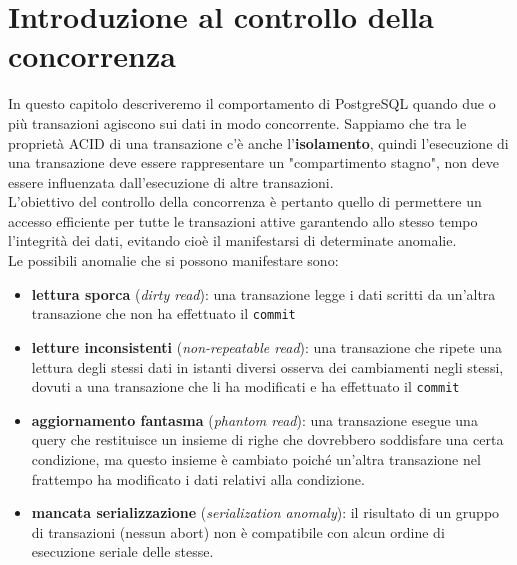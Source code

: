 \documentclass[12pt,a4paper]{book}
\begin{document}
	\chapter{Introduzione al controllo della concorrenza}
	In questo capitolo descriveremo il comportamento di PostgreSQL quando due o più transazioni agiscono sui dati in modo concorrente. Sappiamo che tra le proprietà ACID di una transazione c'è anche l'\textbf{isolamento}, quindi l'esecuzione di una transazione deve essere rappresentare un "compartimento stagno", non deve essere influenzata dall'esecuzione di altre transazioni. \\L'obiettivo del controllo della concorrenza è pertanto quello di permettere un accesso efficiente per tutte le transazioni attive garantendo allo stesso tempo l'integrità dei dati, evitando cioè il manifestarsi di determinate anomalie.\\Le possibili anomalie che si possono manifestare sono:
	\begin{itemize}
		\item \textbf{lettura sporca} (\textit{dirty read}): una transazione legge i dati scritti da un'altra transazione che non ha effettuato il \texttt{commit}
		\item \textbf{letture inconsistenti} (\textit{non-repeatable read}): una transazione che ripete una lettura degli stessi dati in istanti diversi osserva dei cambiamenti negli stessi, dovuti a una transazione che li ha modificati e ha effettuato il \texttt{commit}
		\item \textbf{aggiornamento fantasma} (\textit{phantom read}): una transazione esegue una query che restituisce un insieme di righe che dovrebbero soddisfare una certa condizione, ma questo insieme è cambiato poiché un'altra transazione nel frattempo ha modificato i dati relativi alla condizione.
		\item \textbf{mancata serializzazione} (\textit{serialization anomaly}): il risultato di un gruppo di transazioni (nessun abort) non è compatibile con alcun ordine di esecuzione seriale delle stesse.
	\end{itemize}
\end{document}
